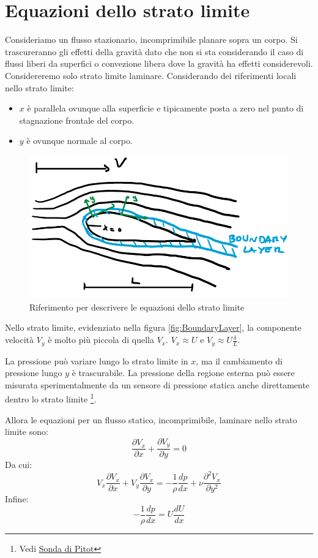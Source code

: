 \section{Equazioni dello strato limite}
Consideriamo un flusso stazionario, incomprimibile planare sopra un corpo.
Si trascureranno gli effetti della gravità dato che non si sta considerando il caso di flussi liberi da superfici o convezione libera dove la gravità ha effetti considerevoli.
Considereremo solo strato limite laminare.
Considerando dei riferimenti locali nello strato limite:
\begin{itemize}
\item $x$ è parallela ovunque alla superficie e tipicamente posta a zero nel punto di stagnazione frontale del corpo. 
\item $y$ è ovunque normale al corpo.
\end{itemize}

\begin{figure}
\centering
\includegraphics[width = \textwidth]{gfx/BoundaryEquation}
\caption{Riferimento per descrivere le equazioni dello strato limite}
\label{fig:BoundaryEquation}
\end{figure}

Nello strato limite, evidenziato nella figura \ref{fig:BoundaryLayer}, la componente velocità $V_y$ è molto più piccola di quella $V_x$.
$V_x \approx U$ e $V_y \approx U \frac{\delta}{L}$.

La pressione può variare lungo lo strato limite in $x$, ma il cambiamento di pressione lungo $y$ è trascurabile.
La pressione della regione esterna può essere misurata sperimentalmente da un sensore di pressione statica anche direttamente dentro lo strato limite%
\footnote{Vedi \href{https://it.wikipedia.org/wiki/Tubo_di_Pitot}{Sonda di Pitot}}.

Allora le equazioni per un flusso statico, incomprimibile, laminare nello strato limite sono:
\begin{equation}
\frac{\partial V_x}{\partial x} + \frac{\partial V_y}{\partial y} = 0
\end{equation}
Da cui:
\begin{equation}
V_x \frac{\partial V_x}{\partial x} + V_y \frac{\partial V_x}{\partial y} =%
-\frac{1}{\rho} \frac{d p}{dx} + \nu\frac{\partial^2 V_x}{\partial y^2}
\end{equation}
Infine:
\begin{equation}
-\frac{1}{\rho} \frac{dp}{dx} = U \frac{dU}{dx}
\end{equation}

